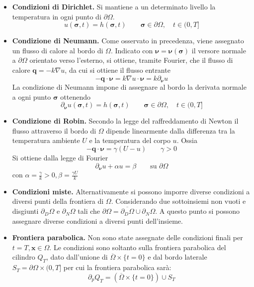 \documentclass[a4paper,12pt, draft]{article}
\theoremstyle{break}
\numberwithin{equation}{section}
\begin{document}
\begin{itemize}
\item \textbf{Condizioni di Dirichlet.} Si mantiene a un determinato livello la temperatura in ogni punto di $\partial \Omega$. 
$$u(\bm{\sigma}, t) = h(\bm{\sigma}, t) \qquad \bm{\sigma} \in \partial \Omega, \quad t \in (0,T]$$
\item \textbf{Condizione di Neumann.} Come osservato in precedenza, viene assegnato un flusso di calore al bordo di $\Omega$. Indicato con $\bm{\nu} = \bm{\nu}(\bm{\sigma})$ il versore normale a $\partial\Omega$ orientato verso l'esterno, si ottiene, tramite Fourier, che il flusso di calore $\mathbf{q} = -k\nabla u$, da cui si ottiene il flusso entrante
$$
-\mathbf{q}\cdot\bm{\nu} = k\nabla u \cdot \bm{\nu} = k \partial_{\bm{\nu}}u
$$
La condizione di Neumann impone di assegnare al bordo la derivata normale a ogni punto $\bm{\sigma}$ ottenendo
$$
\partial_{\bm{\nu}}u(\bm{\sigma},t) = h(\bm{\sigma}, t) \qquad \bm{\sigma} \in \partial \Omega, \quad t \in (0,T]
$$
\item \textbf{Condizione di Robin.} Secondo la legge del raffreddamento di Newton il flusso attraverso il bordo di $\Omega$ dipende linearmente dalla differenza tra la temperatura ambiente $U$ e la temperatura del corpo $u$. Ossia 
$$
-\mathbf{q}\cdot\bm{\nu} = \gamma(U-u) \qquad \gamma > 0
$$
Si ottiene dalla legge di Fourier
$$
\partial_{\bm{\nu}} u + \alpha u =  \beta \qquad \mbox{su }\partial\Omega
$$
con $\alpha = \frac{\gamma}{k} > 0, \beta = \frac{\gamma U}{k}$
\item \textbf{Condizioni miste.} Alternativamente si possono imporre diverse condizioni a diversi punti della frontiera di $\Omega$. Considerando due sottoinsiemi non vuoti e disgiunti $\partial_D\Omega$ e $\partial_N\Omega$ tali che $\partial\Omega = \overline{\partial_D\Omega} \cup \partial_N\Omega$. A questo punto si possono assegnare diverse condizioni a diversi punti dell'insieme.
\item \textbf{Frontiera parabolica.} Non sono state assegnate delle condizioni finali per $t = T, \bm{x} \in \Omega$. Le condizioni sono soltanto sulla frontiera parabolica del cilindro $Q_T$, dato dall'unione di $\overline{\Omega} \times \{t = 0\}$ e dal bordo laterale $S_T = \partial\Omega \times (0, T]$ per cui la frontiera parabolica sarà:
$$
\partial_p Q_T = (\overline{\Omega} \times \{t = 0\}) \cup S_T
$$
\end{itemize}
\end{document}
